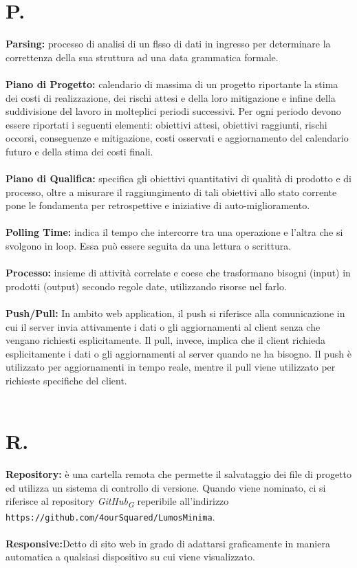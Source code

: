 \documentclass[a4paper, 12pt]{article}
\begin{document}
\section*{P.}
\textbf{Parsing:} processo di analisi di un flsso di dati in ingresso per determinare la correttenza della sua struttura ad una data grammatica formale. \\ \\
\textbf{Piano di Progetto:} calendario di massima di un progetto riportante la stima dei costi di realizzazione, dei rischi attesi e della loro mitigazione e infine della suddivisione del lavoro in molteplici periodi successivi. Per ogni periodo devono essere riportati i seguenti elementi: obiettivi attesi, obiettivi raggiunti, rischi occorsi, conseguenze e mitigazione, costi osservati e aggiornamento del calendario futuro e della stima dei costi finali. \\ \\
\textbf{Piano di Qualifica:} specifica gli obiettivi quantitativi di qualità di prodotto e di processo, oltre a misurare il raggiungimento di tali obiettivi allo stato corrente pone le fondamenta per retrospettive e iniziative di auto-miglioramento. \\ \\
\textbf{Polling Time:} indica il tempo che intercorre tra una operazione e l'altra che si svolgono in loop. Essa può essere seguita da una lettura o scrittura. \\ \\
\textbf{Processo:} insieme di attività correlate e coese che trasformano bisogni (input) in prodotti (output) secondo regole date, utilizzando risorse nel farlo. \\ \\
\textbf{Push/Pull:} In ambito web application, il push si riferisce alla comunicazione in cui il server invia attivamente i dati o gli aggiornamenti al client senza che vengano richiesti esplicitamente. Il pull, invece, implica che il client richieda esplicitamente i dati o gli aggiornamenti al server quando ne ha bisogno. Il push è utilizzato per aggiornamenti in tempo reale, mentre il pull viene utilizzato per richieste specifiche del client. \\ \\

\newpage
\section*{R.}
\textbf{Repository:} è una cartella remota che permette il salvataggio dei file
di progetto ed utilizza un sistema di controllo di versione. Quando
viene nominato, ci si riferisce al repository \textit{GitHub\textsubscript{G}} reperibile all’indirizzo \texttt{https://github.com/4ourSquared/LumosMinima}.  \\ \\
\textbf{Responsive:}Detto di sito web in grado di adattarsi graficamente in maniera automatica a qualsiasi dispositivo su cui viene visualizzato. \\ \\
\end{document}
